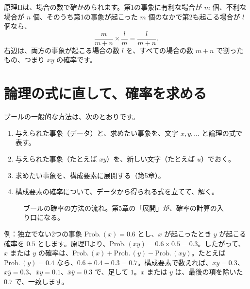 \documentclass[a4paper,11pt,openany]{ltjsbook}
\newcommand{\nx}[1]{\overline{#1}}
\newcommand{\Prob}{\mathrm{Prob.}\,}
\begin{document}
原理IIは、場合の数で確かめられます。第1の事象に有利な場合が $m$ 個、不利な場合が $n$ 個、そのうち第1の事象が起こった $m$ 個のなかで第2も起こる場合が $l$ 個なら、
\[
\frac{m}{m+n}\times\frac{l}{m}=\frac{l}{m+n}.
\]
右辺は、両方の事象が起こる場合の数 $l$ を、すべての場合の数 $m+n$ で割ったもの、つまり $xy$ の確率です。

\section{論理の式に直して、確率を求める}

ブールの一般的な方法は、次のとおりです。

\begin{enumerate}[leftmargin=*]
\item 与えられた事象（データ）と、求めたい事象を、文字 $x,y,\ldots$ と論理の式で表す。
\item 与えられた事象（たとえば $xy$）を、新しい文字（たとえば $u$）でおく。
\item 求めたい事象を、構成要素に展開する（第5章）。
\item 構成要素の確率について、データから得られる式を立てて、解く。
\end{enumerate}

\begin{figure}[htbp]
\centering
{}
\caption{ブールの確率の方法の流れ。第5章の「展開」が、確率の計算の入り口になる。}
\end{figure}

\begin{examplebox}{例：独立でない2つの事象}
$\Prob(x)=0.6$ とし、$x$ が起こったとき $y$ が起こる確率を $0.5$ とします。原理IIより、$\Prob(xy)=0.6\times0.5=0.3$。したがって、$x$ または $y$ の確率は、$\Prob(x)+\Prob(y)-\Prob(xy)$。たとえば $\Prob(y)=0.4$ なら、$0.6+0.4-0.3=0.7$。構成要素で数えれば、$xy=0.3$、$x\nx y=0.3$、$\nx x y=0.1$、$\nx x\nx y=0.3$ で、足して $1$。$x$ または $y$ は、最後の項を除いた $0.7$ で、一致します。
\end{examplebox}
\end{document}
